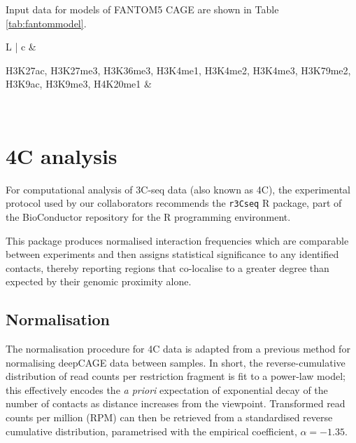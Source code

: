 \documentclass[a4paper,11pt,oneside]{book}
\begin{document}
Input data for models of FANTOM5 CAGE are shown in Table \ref{tab:fantommodel}.

\begin{table}[h]
\centering
\caption{ ENCODE datasets generated in the H1 hESC cell line and used in models of transcriptional output. }
\label{tab:fantommodel}
\begin{tabular}{L |  c} \toprule
{} &
 \\
\midrule

H3K27ac, 
H3K27me3, 
H3K36me3, 
H3K4me1, 
H3K4me2,  
H3K4me3, 
H3K79me2, 
H3K9ac, 
H3K9me3, 
H4K20me1 &

\\

\end{tabular}
\end{table}

\section{4C analysis}\label{methods:4c}

For computational analysis of 3C-seq data (also known as 4C), the experimental protocol used by our collaborators recommends the \texttt{r3Cseq} R package,\cite{Stadhouders2013, Thongjuea2013} part of the BioConductor repository\cite{Gentleman2004, Huber2015} for the R programming environment.\cite{Ihaka1996}

This package produces normalised interaction frequencies which are comparable between experiments and then assigns statistical significance to any identified contacts, thereby reporting regions that co-localise to a greater degree than expected by their genomic proximity alone.

\subsection{Normalisation}\label{methods:4cnorm}

The normalisation procedure for 4C data is adapted from a previous method for normalising deepCAGE data between samples.\cite{Balwierz2009} In short, the reverse-cumulative distribution of read counts per restriction fragment is fit to a power-law model; this effectively encodes the \emph{a priori} expectation of exponential decay of the number of contacts as distance increases from the viewpoint. Transformed read counts per million (RPM) can then be retrieved from a standardised reverse cumulative distribution, parametrised with the empirical coefficient, $\alpha = -1.35$.\cite{Thongjuea2013}
\end{document}
